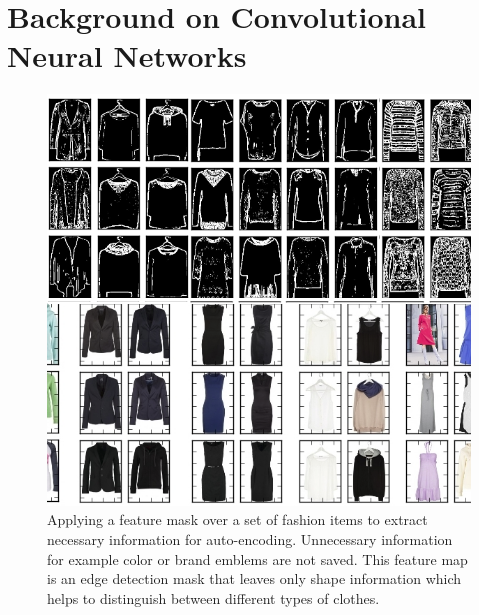 \chapter{Background on Convolutional Neural Networks}\label{ch:cnn}

\begin{figure}[t!]
\centering
\includegraphics[width=.48\linewidth]{figs/convolution.png}
\caption{Applying a feature mask over a set of fashion items to extract necessary information for auto-encoding. Unnecessary information for example color or brand emblems are not saved. This feature map is an edge detection mask that leaves only shape information which helps to distinguish between different types of clothes.} 
\label{fig:convolution}
\end{figure}


